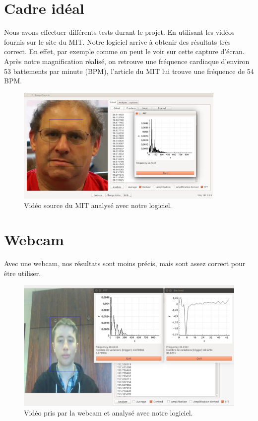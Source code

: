 \section{Cadre idéal}

Nous avons effectuer différents tests durant le projet. En utilisant les vidéos fournis sur le site du MIT. Notre logiciel arrive à obtenir des 
résultats très correct. En effet, par exemple comme on peut le voir sur cette capture d'écran. Après notre magnification réalisé, on retrouve
une fréquence cardiaque d'environ 53 battements par minute (BPM), l'article du MIT lui trouve une fréquence de 54 BPM.  

\begin{figure}[h!]
	\centering
	\includegraphics[width=0.9\textwidth]{data/cas-ideal.png}
	\caption{Vidéo source du MIT analysé avec notre logiciel.}
\end{figure}


\section{Webcam}

Avec une webcam, nos résultats sont moins précis, mais sont assez correct pour être utiliser. 

\begin{figure}[h!]
	\centering
	\includegraphics[width=1\textwidth]{data/webcam.png}
	\caption{Vidéo pris par la webcam et analysé avec notre logiciel.}
\end{figure}

